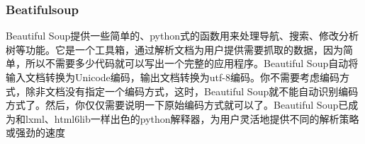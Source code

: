 \subsubsection*{Beatifulsoup}
Beautiful Soup提供一些简单的、python式的函数用来处理导航、搜索、修改分析树等功能。它是一个工具箱，通过解析文档为用户提供需要抓取的数据，因为简单，所以不需要多少代码就可以写出一个完整的应用程序。Beautiful Soup自动将输入文档转换为Unicode编码，输出文档转换为utf-8编码。你不需要考虑编码方式，除非文档没有指定一个编码方式，这时，Beautiful Soup就不能自动识别编码方式了。然后，你仅仅需要说明一下原始编码方式就可以了。Beautiful Soup已成为和lxml、html6lib一样出色的python解释器，为用户灵活地提供不同的解析策略或强劲的速度



